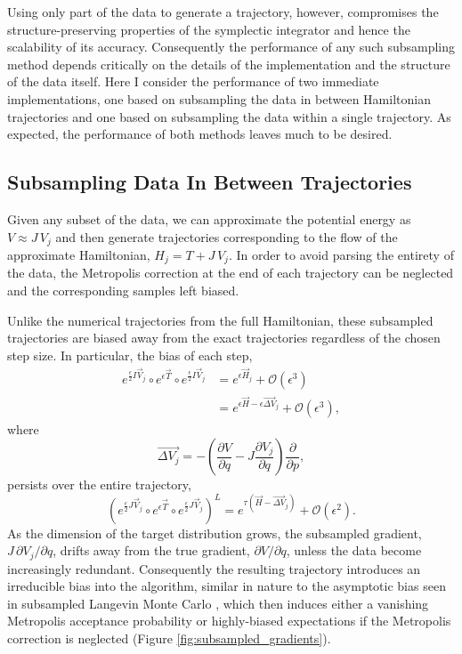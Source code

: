 \documentclass{article}
\begin{document}
Using only part of the data to generate a trajectory, however, compromises the
structure-preserving properties of the symplectic integrator and hence the scalability
of its accuracy.  Consequently the performance of any such subsampling method 
depends critically on the details of the implementation and the structure of the data itself.  
Here I consider the performance of two immediate implementations, one based on 
subsampling the data in between Hamiltonian trajectories and one based on subsampling 
the data within a single trajectory.  As expected, the performance of both methods leaves 
much to be desired.

\subsection{Subsampling Data In Between Trajectories}

Given any subset of the data, we can approximate the potential energy as 
$V \approx J \, V_{j}$ and then generate trajectories corresponding to the flow of the 
approximate Hamiltonian, $H_{j} = T + J \, V_{j}$.  In order to avoid parsing the entirety
of the data, the Metropolis correction at the end of each trajectory can be neglected and 
the corresponding samples left biased.

Unlike the numerical trajectories from the full Hamiltonian, these subsampled 
trajectories are biased away from the exact trajectories regardless of the chosen step size.  
In particular, the bias of each step,
%
\begin{align*}
e^{\frac{\epsilon}{2} I \vec{V}_{j} } \circ 
e^{\epsilon \vec{T} } \circ 
e^{\frac{\epsilon}{2} I \vec{V}_{j} }
&=
e^{ \epsilon \vec{H}_{j} }
+ \mathcal{O} \! \left( \epsilon^{3} \right)
\\
&=
e^{ \epsilon \vec{H} - \epsilon \overrightarrow{ \Delta V}_{j} }
+ \mathcal{O} \! \left( \epsilon^{3} \right),
\end{align*}
%
where
%
\begin{equation} \label{eqn:between_bias}
\overrightarrow{ \Delta V_{j} } = 
- \left( \frac{ \partial V }{ \partial q } - J \frac{ \partial V_{j} }{ \partial q } \right)
\frac{ \partial }{ \partial p },
\end{equation}
%
persists over the entire trajectory,
%
\begin{equation*}
\left( e^{\frac{\epsilon}{2} J \vec{V}_{j} } \circ 
e^{\epsilon \vec{T} } \circ 
e^{\frac{\epsilon}{2} J \vec{V}_{j} } \right)^{L}
=
e^{ \tau \left( \vec{H} - \overrightarrow{ \Delta V}_{j} \right) }
+ \mathcal{O} \! \left( \epsilon^{2} \right).
\end{equation*}
%
As the dimension of the target distribution grows, the subsampled gradient,
$J \, \partial V_{j} / \partial q $, drifts away from the true gradient, 
$\partial V / \partial q $, unless the data become increasingly redundant.
Consequently the resulting trajectory introduces an irreducible bias into
the algorithm, similar in nature to the asymptotic bias seen in subsampled
Langevin Monte Carlo \cite{TehEtAl:2014, VollmerEtAl:2015}, which then 
induces either a vanishing Metropolis acceptance probability 
or highly-biased expectations if the Metropolis correction is neglected 
(Figure \ref{fig:subsampled_gradients}).  
\end{document}
